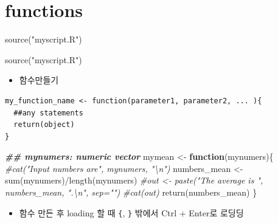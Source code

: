 \documentclass[
]{book}
\newenvironment{Shaded}{\begin{snugshade}}{\end{snugshade}}
\newcommand{\CommentTok}[1]{\textcolor[rgb]{0.56,0.35,0.01}{\textit{#1}}}
\newcommand{\ControlFlowTok}[1]{\textcolor[rgb]{0.13,0.29,0.53}{\textbf{#1}}}
\newcommand{\DocumentationTok}[1]{\textcolor[rgb]{0.56,0.35,0.01}{\textbf{\textit{#1}}}}
\newcommand{\FunctionTok}[1]{\textcolor[rgb]{0.00,0.00,0.00}{#1}}
\newcommand{\NormalTok}[1]{#1}
\newcommand{\OtherTok}[1]{\textcolor[rgb]{0.56,0.35,0.01}{#1}}
\newcommand{\SpecialCharTok}[1]{\textcolor[rgb]{0.00,0.00,0.00}{#1}}
\newcommand{\StringTok}[1]{\textcolor[rgb]{0.31,0.60,0.02}{#1}}
\providecommand{\tightlist}{%
  \setlength{\itemsep}{0pt}\setlength{\parskip}{0pt}}
\begin{document}
\hypertarget{functions-1}{%
\section{functions}\label{functions-1}}

\begin{Shaded}
\begin{Highlighting}[]

\FunctionTok{source}\NormalTok{(}\StringTok{"myscript.R"}\NormalTok{)}
\end{Highlighting}
\end{Shaded}

\begin{Shaded}
\begin{Highlighting}[]
\FunctionTok{source}\NormalTok{(}\StringTok{"myscript.R"}\NormalTok{)}
\end{Highlighting}
\end{Shaded}

\begin{itemize}
\tightlist
\item
  함수만들기
\end{itemize}

\begin{verbatim}
my_function_name <- function(parameter1, parameter2, ... ){
  ##any statements
  return(object)
}
\end{verbatim}

\begin{Shaded}
\begin{Highlighting}[]

\DocumentationTok{\#\# mynumers: numeric vector}
\NormalTok{mymean }\OtherTok{\textless{}{-}} \ControlFlowTok{function}\NormalTok{(mynumers)\{}
  \CommentTok{\#cat("Input numbers are", mynumers, "\textbackslash{}n")}
\NormalTok{  numbers\_mean }\OtherTok{\textless{}{-}} \FunctionTok{sum}\NormalTok{(mynumers)}\SpecialCharTok{/}\FunctionTok{length}\NormalTok{(mynumers)}
  \CommentTok{\#out \textless{}{-} paste("The average is ", numbers\_mean, ".\textbackslash{}n", sep="")}
  \CommentTok{\#cat(out)}
  \FunctionTok{return}\NormalTok{(numbers\_mean)}
\NormalTok{\}}
\end{Highlighting}
\end{Shaded}

\begin{itemize}
\tightlist
\item
  함수 만든 후 loading 할 때 \texttt{\{}, \texttt{\}} 밖에서 Ctrl + Enter로 로딩딩
\end{itemize}
\end{document}

